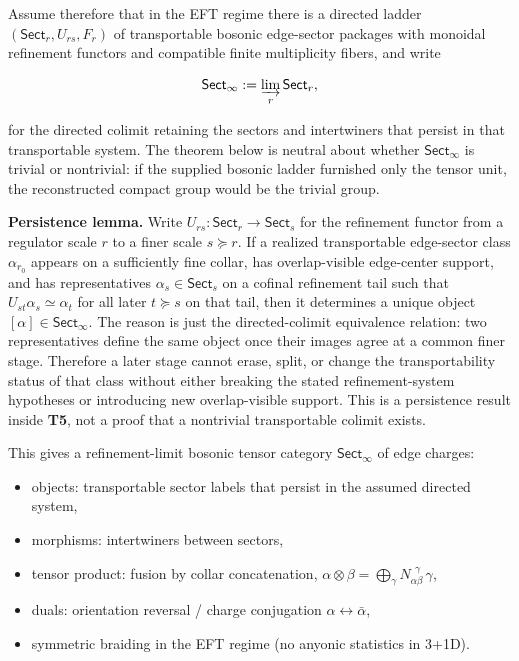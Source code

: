Assume therefore that in the EFT regime there is a directed ladder \((\mathsf{Sect}_r,U_{rs},F_r)\) of transportable bosonic edge-sector packages with monoidal refinement functors and compatible finite multiplicity fibers, and write

\[
\mathsf{Sect}_\infty := \varinjlim_r \mathsf{Sect}_r,
\]

for the directed colimit retaining the sectors and intertwiners that persist in that transportable system. The theorem below is neutral about whether \(\mathsf{Sect}_\infty\) is trivial or nontrivial: if the supplied bosonic ladder furnished only the tensor unit, the reconstructed compact group would be the trivial group.

\textbf{Persistence lemma.} Write \(U_{rs}:\mathsf{Sect}_r\to\mathsf{Sect}_s\) for the refinement functor from a regulator scale \(r\) to a finer scale \(s\succeq r\). If a realized transportable edge-sector class \(\alpha_{r_0}\) appears on a sufficiently fine collar, has overlap-visible edge-center support, and has representatives \(\alpha_s\in\mathsf{Sect}_s\) on a cofinal refinement tail such that \(U_{st}\alpha_s\simeq\alpha_t\) for all later \(t\succeq s\) on that tail, then it determines a unique object \([\alpha]\in\mathsf{Sect}_\infty\). The reason is just the directed-colimit equivalence relation: two representatives define the same object once their images agree at a common finer stage. Therefore a later stage cannot erase, split, or change the transportability status of that class without either breaking the stated refinement-system hypotheses or introducing new overlap-visible support. This is a persistence result inside \textbf{T5}, not a proof that a nontrivial transportable colimit exists.

This gives a refinement-limit bosonic tensor category \(\mathsf{Sect}_\infty\) of edge charges:

\begin{itemize}
\tightlist
\item
  objects: transportable sector labels that persist in the assumed directed system,
\item
  morphisms: intertwiners between sectors,
\item
  tensor product: fusion by collar concatenation, \(\alpha \otimes \beta = \bigoplus_\gamma N_{\alpha\beta}^{\ \ \gamma}\,\gamma\),
\item
  duals: orientation reversal / charge conjugation \(\alpha \leftrightarrow \bar\alpha\),
\item
  symmetric braiding in the EFT regime (no anyonic statistics in 3+1D).
\end{itemize}

